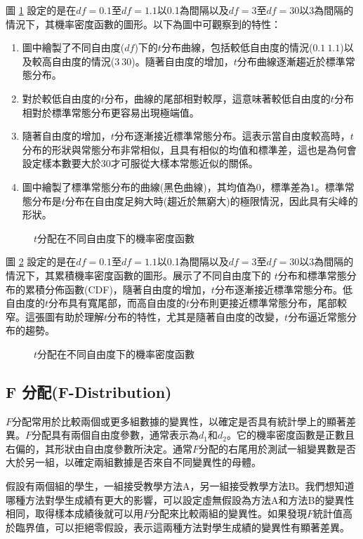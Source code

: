 圖 \ref{fig:t-distribution_pdf} 設定的是在$df=0.1$至$df=1.1$以0.1為間隔以及$df=3$至$df=30$以3為間隔的情況下，其機率密度函數的圖形。以下為圖中可觀察到的特性：
\begin{enumerate}
\item 圖中繪製了不同自由度($df$)下的$t$分布曲線，包括較低自由度的情況($0.1~1.1$)以及較高自由度的情況($3~30$)。隨著自由度的增加，$t$分布曲線逐漸趨近於標準常態分布。
\item 對於較低自由度的$t$分布，曲線的尾部相對較厚，這意味著較低自由度的$t$分布相對於標準常態分布更容易出現極端值。
\item 隨著自由度的增加，$t$分布逐漸接近標準常態分布。這表示當自由度較高時，$t$分布的形狀與常態分布非常相似，且具有相似的均值和標準差，這也是為何會設定樣本數要大於30才可服從大樣本常態近似的關係。
\item 圖中繪製了標準常態分布的曲線(黑色曲線)，其均值為0，標準差為1。標準常態分布是$t$分布在自由度足夠大時(趨近於無窮大)的極限情況，因此具有尖峰的形狀。
\end{enumerate}
\begin{figure}[H]
    \caption{$t$分配在不同自由度下的機率密度函數}
    \label{fig:t-distribution_pdf}
\end{figure}
圖 \ref{fig:t-distribution_cdf} 設定的是在$df=0.1$至$df=1.1$以0.1為間隔以及$df=3$至$df=30$以3為間隔的情況下，其累積機率密度函數的圖形。展示了不同自由度下的 $t$分布和標準常態分布的累積分佈函數(CDF)，隨著自由度的增加，$t$分布逐漸接近標準常態分布。低自由度的$t$分布具有寬尾部，而高自由度的$t$分布則更接近標準常態分布，尾部較窄。這張圖有助於理解$t$分布的特性，尤其是隨著自由度的改變，$t$分布逼近常態分布的趨勢。
\begin{figure}[H]
    \caption{$t$分配在不同自由度下的機率密度函數}
    \label{fig:t-distribution_cdf}
\end{figure}
\subsection{F 分配(F-Distribution)}
$F$分配常用於比較兩個或更多組數據的變異性，以確定是否具有統計學上的顯著差異。$F$分配具有兩個自由度參數，通常表示為$d_1$和$d_2$。它的機率密度函數是正數且右偏的，其形狀由自由度參數所決定。通常$F$分配的右尾用於測試一組變異數是否大於另一組，以確定兩組數據是否來自不同變異性的母體。

假設有兩個組的學生，一組接受教學方法A，另一組接受教學方法B。我們想知道哪種方法對學生成績有更大的影響，可以設定虛無假設為方法A和方法B的變異性相同，取得樣本成績後就可以用$F$分配來比較兩組的變異性。如果發現$F$統計值高於臨界值，可以拒絕零假設，表示這兩種方法對學生成績的變異性有顯著差異。


